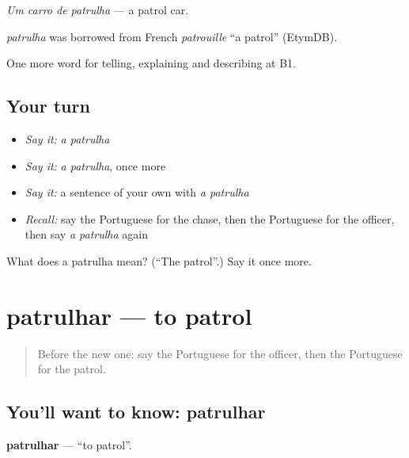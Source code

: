 \emph{Um carro de patrulha} — a patrol car.

\begin{cousinweb}
\emph{patrulha} was borrowed from French \emph{patrouille} \textquotedblleft{}a patrol\textquotedblright{} (EtymDB).
\end{cousinweb}

\begin{grammarlens}[title={What you've built}]
One more word for telling, explaining and describing at B1.
\end{grammarlens}

\subsection*{Your turn}
\begin{itemize}
\raggedright
  \item \emph{Say it:} \emph{a patrulha}
  \item \emph{Say it:} \emph{a patrulha}, once more
  \item \emph{Say it:} a sentence of your own with \emph{a patrulha}
  \item \emph{Recall:} say the Portuguese for the chase, then the Portuguese for the officer, then say \emph{a patrulha} again
\end{itemize}

\begin{tcolorbox}[breakable,colback=teal!4,colframe=teal!35!black,title={Before you move on}]
What does a patrulha mean? (\textquotedblleft{}The patrol\textquotedblright{}.) Say it once more.
\end{tcolorbox}
\section[patrulhar]{patrulhar — to patrol}

\label{lesson:PT-C293-patrulhar}



\begin{quote}
Before the new one: say the Portuguese for the officer, then the Portuguese for the patrol.
\end{quote}

\subsection*{You'll want to know: patrulhar}
\textbf{patrulhar} — \textquotedblleft{}to patrol\textquotedblright{}.

